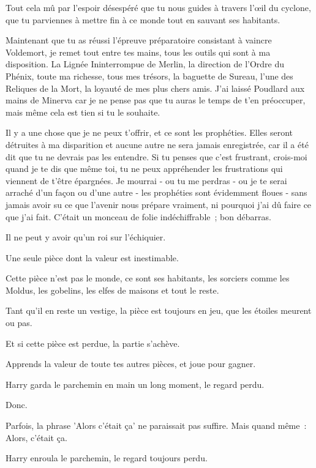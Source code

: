 \begin{writtenNote}
Tout cela mû par l'espoir désespéré que tu nous guides à travers l'œil du cyclone, que tu parviennes à mettre fin à ce monde tout en sauvant ses habitants.

Maintenant que tu as réussi l'épreuve préparatoire consistant à vaincre Voldemort, je remet tout entre tes mains, tous les outils qui sont à ma disposition. La Lignée Ininterrompue de Merlin, la direction de l'Ordre du Phénix, toute ma richesse, tous mes trésors, la baguette de Sureau, l'une des Reliques de la Mort, la loyauté de mes plus chers amis. J'ai laissé Poudlard aux mains de Minerva car je ne pense pas que tu auras le temps de t'en préoccuper, mais même cela est tien si tu le souhaite.

Il y a une chose que je ne peux t'offrir, et ce sont les prophéties. Elles seront détruites à ma disparition et aucune autre ne sera jamais enregistrée, car il a été dit que tu ne devrais pas les entendre. Si tu penses que c'est frustrant, crois-moi quand je te dis que même toi, tu ne peux appréhender les frustrations qui viennent de t'être épargnées. Je mourrai - ou tu me perdras - ou je te serai arraché d'un façon ou d'une autre - les prophéties sont évidemment floues - sans jamais avoir su ce que l'avenir nous prépare vraiment, ni pourquoi j'ai dû faire ce que j'ai fait. C'était un monceau de folie indéchiffrable~; bon débarras.

Il ne peut y avoir qu'un roi sur l'échiquier.

Une seule pièce dont la valeur est inestimable.

Cette pièce n'est pas le monde, ce sont ses habitants, les sorciers comme les Moldus, les gobelins, les elfes de maisons et tout le reste.

Tant qu'il en reste un vestige, la pièce est toujours en jeu, que les étoiles meurent ou pas.

Et si cette pièce est perdue, la partie s'achève.

Apprends la valeur de toute tes autres pièces, et joue pour gagner.

\end{writtenNote}

\later

Harry garda le parchemin en main un long moment, le regard perdu.

Donc.

Parfois, la phrase 'Alors c'était ça' ne paraissait pas suffire. Mais quand même~: Alors, c'était ça.

Harry enroula le parchemin, le regard toujours perdu.

